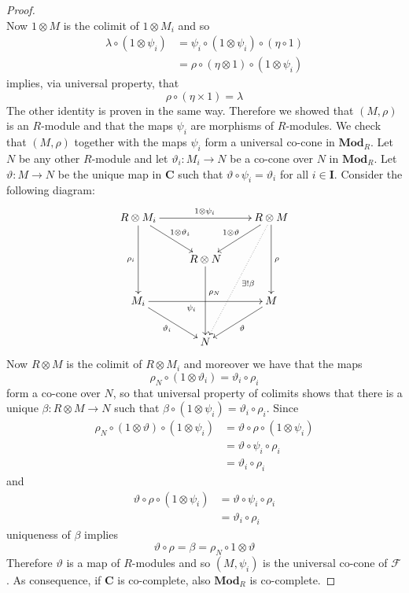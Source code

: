\begin{refsection}
\begin{proof}
\begin{equation*}
\end{equation*}
Now $1 \otimes M$ is the colimit of $1 \otimes M_i$ and so
\begin{align*}
\lambda \circ (1 \otimes \psi_i) & = \psi_i \circ (1 \otimes \psi_i) \circ (\eta \circ 1) \\ & = \rho \circ (\eta \otimes 1) \circ (1 \otimes \psi_i)
\end{align*}
implies, via universal property, that
\begin{equation*}
\rho \circ (\eta \times 1) = \lambda
\end{equation*}
The other identity is proven in the same way. Therefore we showed that $(M, \rho)$ is an $R$-module and that the maps $\psi_i$ are morphisms of $R$-modules. We check that $(M,\rho)$ together with the maps $\psi_i$ form a universal co-cone in $\mathbf{Mod}_R$. Let $N$ be any other $R$-module and let $\vartheta_i \colon M_i \to N$ be a co-cone over $N$ in $\mathbf{Mod}_R$. Let $\vartheta \colon M \to N$ be the unique map in $\mathbf C$ such that $\vartheta \circ \psi_i = \vartheta_i$ for all $i \in \mathbf I$. Consider the following diagram:
\begin{equation*}
\xymatrix { R \otimes M_i \ar[rr]^{1 \otimes \psi_i} \ar[dr]^{1 \otimes \vartheta_i} \ar[dd]_{\rho_i} & & R \otimes M \ar[dd]^\rho \ar[dl]_{1 \otimes \vartheta} \ar@{.>}^{\exists ! \beta}[dddl] \\ & R \otimes N \ar[dd]^(.4){\rho_N} \\ M_i \ar[rr]_(.4){\psi_i} \ar[dr]_{\vartheta_i} & & M \ar[dl]^{\vartheta} \\ & N }
\end{equation*}
Now $R \otimes M$ is the colimit of $R \otimes M_i$ and moreover we have that the maps
\begin{equation*}
\rho_N \circ (1 \otimes \vartheta_i) = \vartheta_i \circ \rho_i
\end{equation*}
form a co-cone over $N$, so that universal property of colimits shows that there is a unique $\beta \colon R \otimes M \to N$ such that $\beta \circ (1 \otimes \psi_i) = \vartheta_i \circ \rho_i$. Since
\begin{align*}
\rho_N \circ (1 \otimes \vartheta) \circ (1 \otimes \psi_i) & = \vartheta \circ \rho \circ (1 \otimes \psi_i) \\
& = \vartheta \circ \psi_i \circ \rho_i \\
& = \vartheta_i \circ \rho_i
\end{align*}
and
\begin{align*}
\vartheta \circ \rho \circ (1 \otimes \psi_i) & = \vartheta \circ \psi_i \circ \rho_i \\
& = \vartheta_i \circ \rho_i
\end{align*}
uniqueness of $\beta$ implies
\begin{equation*}
\vartheta \circ \rho = \beta = \rho_N \circ 1 \otimes \vartheta
\end{equation*}
Therefore $\vartheta$ is a map of $R$-modules and so $(M,\psi_i)$ is the universal co-cone of $\mathcal F$. As consequence, if $\mathbf C$ is co-complete, also $\mathbf{Mod}_R$ is co-complete.


\end{proof}
\end{refsection}
